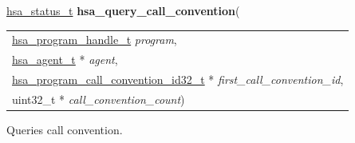 \documentclass[final]{book}
\newcommand{\hsaarg}[1]{\textit{#1}}
\begin{document}
\begin{appendices}
\noindent\begin{tcolorbox}[breakable,nobeforeafter,colframe=white,colback=lightgray,left=0mm]
\hyperlink{group--status-1gad755322e7ff95456520e8abdbe90d225}{hsa_status_t} \hypertarget{group--HsailLinkerServiceLayer-1gad3238b59489b1f15b4e74e71ec13da97}{\textbf{hsa_query_call_convention}}(
\vspace{-3.5mm}\begin{longtable}{@{}p{\textwidth}}
\hspace{1.7em}\hyperlink{group--HsailLinkerServiceLayer-1ga7b28ca39da981be49aac99608eb386cb}{hsa_program_handle_t} \hsaarg{program},\\
\hspace{1.7em}\hyperlink{group--topology-1gab8db3fb886332a24acac08ec361e1d86}{hsa_agent_t} * \hsaarg{agent},\\
\hspace{1.7em}\hyperlink{group--FinalizerCoreApi-1ga8864426eb7d3278691632007c4eeebeb}{hsa_program_call_convention_id32_t} * \hsaarg{first_call_convention_id},\\
\hspace{1.7em}uint32_t * \hsaarg{call_convention_count})\end{longtable}

\end{tcolorbox}
Queries call convention.


\end{appendices}
\end{document}
